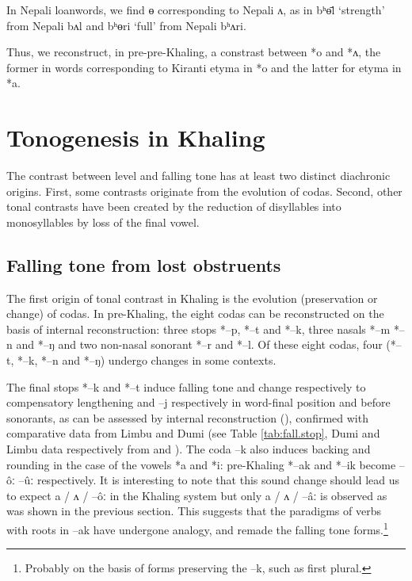 \documentclass[oldfontcommands,oneside,a4paper,11pt]{article}
\newcommand{\ipa}[1]{{\phon \mbox{#1}}} %
\begin{document}
In Nepali loanwords, we find \ipa{ɵ} corresponding to Nepali  \ipa{ʌ}, as in \ipa{bʰɵ̄l}	`strength' from Nepali \ipa{bʌl} and \ipa{bʰɵri}	`full' from Nepali \ipa{bʰʌri}.

Thus, we reconstruct, in pre-pre-Khaling, a constrast between \ipa{*o} and \ipa{*ʌ}, the former in words corresponding to Kiranti etyma in \ipa{*o} and the latter for etyma in \ipa{*a}.


\section{Tonogenesis in Khaling}
The contrast between level and falling tone has at least two distinct diachronic origins. First, some contrasts originate from the evolution of codas. Second, other tonal contrasts have been created by the reduction of disyllables into monosyllables by loss of the final vowel.


\subsection{Falling tone from lost obstruents} \label{sec:obstruents}
 The first origin of tonal contrast in Khaling is the evolution (preservation or change) of codas. In pre-Khaling, the eight codas can be reconstructed on the basis of internal reconstruction: three stops \ipa{*--p}, \ipa{*--t} and \ipa{*--k}, three nasals \ipa{*--m} \ipa{*--n} and \ipa{*--ŋ} and two non-nasal sonorant \ipa{*--r} and \ipa{*--l}. Of these eight codas, four (*--t, \ipa{*--k}, \ipa{*--n} and \ipa{*--ŋ}) undergo changes in some contexts. 


The final stops \ipa{*--k} and \ipa{*--t} induce falling tone and change respectively to compensatory lengthening and \ipa{--j} respectively in word-final position and before sonorants, as can be assessed by internal reconstruction (\citealt{jacques12khaling}), confirmed with comparative data from Limbu and Dumi (see Table \ref{tab:fall.stop}, Dumi and Limbu data respectively from \citealt{driem93dumi} and \citealt{michailovsky02dico}). The coda \ipa{--k} also induces backing and rounding in the case of the vowels \ipa{*a} and \ipa{*i}: pre-Khaling \ipa{*--ak} and \ipa{*--ik} become \ipa{--ôː} \ipa{--ûː} respectively. It is interesting to note that this sound change should lead us to expect \ipa{a} / \ipa{ʌ} / \ipa{--ôː} in the Khaling system but only \ipa{a} / \ipa{ʌ} / \ipa{--âː} is observed as was shown in the previous section. This suggests that the paradigms of verbs with roots in \ipa{--ak} have undergone analogy, and remade the falling tone forms.\footnote{Probably on the basis of forms preserving the \ipa{--k}, such as   first plural.}
\end{document}

